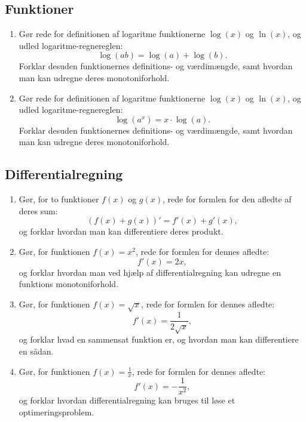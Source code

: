 \documentclass[10pt,a4paper]{article}
\begin{document}
\subsection*{Funktioner}
\begin{enumerate}[resume]
\item Gør rede for definitionen af logaritme funktionerne $\log(x)$ og $\ln(x)$, og udled logaritme-regnereglen:
$$\log(ab)=\log(a)+\log(b).$$
Forklar desuden funktionernes definitions- og værdimængde, samt hvordan man kan udregne deres monotoniforhold.
\item Gør rede for definitionen af logaritme funktionerne $\log(x)$ og $\ln(x)$, og udled logaritme-regnereglen:
$$\log(a^x)=x\cdot \log(a).$$
Forklar desuden funktionernes definitions- og værdimængde, samt hvordan man kan udregne deres monotoniforhold.
\end{enumerate}

\subsection*{Differentialregning}
\begin{enumerate}[resume]
\item Gør, for to funktioner $f(x)$ og $g(x)$, rede for formlen for den afledte af deres sum:
$$\left(f(x)+g(x)\right)'=f'(x)+g'(x),$$
og forklar hvordan man kan differentiere deres produkt.
\item Gør, for funktionen $f(x)=x^2$, rede for formlen for dennes afledte:
$$f'(x)=2x,$$
og forklar hvordan man ved hjælp af differentialregning kan udregne en funktions monotoniforhold.
\item Gør, for funktionen $f(x)=\sqrt{x}$, rede for formlen for dennes afledte:
$$f'(x)=\frac{1}{2\sqrt{x}},$$
og forklar hvad en sammensat funktion er, og hvordan man kan differentiere en sådan.
\item Gør, for funktionen $f(x)=\frac{1}{x}$, rede for formlen for dennes afledte:
$$f'(x)=-\frac{1}{x^2},$$
og forklar hvordan differentialregning kan bruges til løse et optimeringsproblem.
\end{enumerate}
\end{document}
